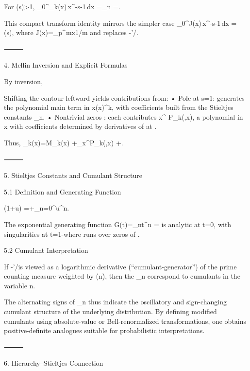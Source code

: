 For \Re(s)>1,
\int_0^\infty \Psi_k(x)\,x^{-s-1}\,dx
=\sum_{n}
=.

This compact transform identity mirrors the simpler case
\int_0^\infty J(x)\,x^{-s-1}\,dx = \log \zeta(s),
where J(x)=\sum_{p^m\le x}1/m and \log\zeta replaces -\zeta’/\zeta.

⸻

4. Mellin Inversion and Explicit Formulas

By inversion,

Shifting the contour leftward yields contributions from:
	•	Pole at s=1: generates the polynomial main term in x(\log x)^k, with coefficients built from the Stieltjes constants \gamma_n.
	•	Nontrivial zeros \rho: each contributes x^{\rho} P_k(\rho,\log x), a polynomial in \log x with coefficients determined by derivatives of \zeta at \rho.

Thus,
\Psi_k(x)=M_k(x)
+\sum_\rho x^{\rho}P_k(\rho,\log x)
+.

⸻

5. Stieltjes Constants and Cumulant Structure

5.1 Definition and Generating Function

\zeta(1+u)
=+\sum_{n=0}^\infty{}u^n.

The exponential generating function
G(t)=\sum_{n}t^n
=
is analytic at t=0, with singularities at t=1-\rho where \rho runs over zeros of \zeta.

5.2 Cumulant Interpretation

If -\zeta’/\zeta is viewed as a logarithmic derivative (“cumulant-generator”) of the prime counting measure weighted by \Lambda(n), then the \gamma_n correspond to cumulants in the variable \log n.

The alternating signs of \gamma_n thus indicate the oscillatory and sign-changing cumulant structure of the underlying distribution.
By defining modified cumulants using absolute-value or Bell-renormalized transformations, one obtains positive-definite analogues suitable for probabilistic interpretations.

⸻

6. Hierarchy–Stieltjes Connection

